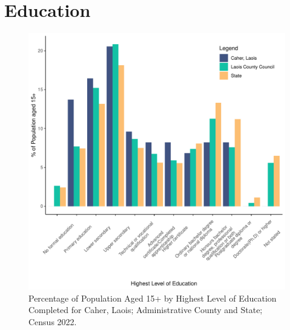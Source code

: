 \documentclass{article}
\begin{document}
\section{Education}\label{sect:Edu}
\begin{figure}[H]
	\centering
	\includegraphics[width = 120mm]{../figures/EduED.pdf}
	\caption{Percentage of Population Aged 15+ by Highest Level of Education Completed for Caher, Laois; Administrative County and State; Census 2022.}
	\label{fig:vbnv}
	\end{figure}
\end{document}
